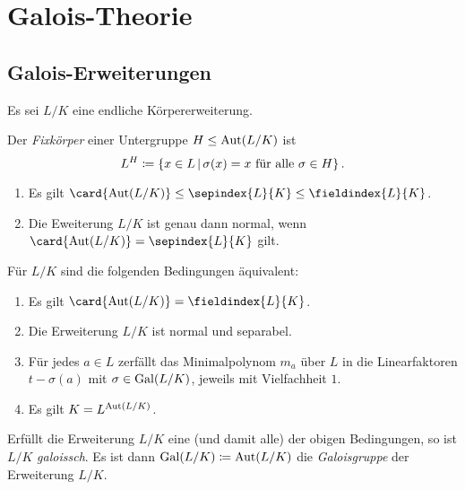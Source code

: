 \chapter{Galois-Theorie}





\section{Galois-Erweiterungen}

Es sei $L/K$ eine endliche Körpererweiterung.

\begin{definition}
  Der \emph{Fixkörper} einer Untergruppe $H \mathrel{\leq} \operatorname{Aut}(L/K)$ ist
  \[
              L^H
    \defined  \{
                x \in L
              \suchthat
                \text{$\sigma(x) = x$ für alle $\sigma \in H$}
              \} \,.
  \]

\end{definition}

\begin{lemma}
  \begin{enumerate}
    \item
      Es gilt $\card{\Aut{L/K}} \leq \sepindex{L}{K} \leq \fieldindex{L}{K}$.
    \item
      Die Eweiterung $L/K$ ist genau dann normal, wenn $\card{\Aut{L/K}} = \sepindex{L}{K}$ gilt.
  \end{enumerate}
\end{lemma}


\begin{proposition}
  Für $L/K$ sind die folgenden Bedingungen äquivalent:
  \begin{enumerate}
    \item
      Es gilt $\card{\Aut{L/K}} = \fieldindex{L}{K}$.
    \item
      Die Erweiterung $L/K$ ist normal und separabel.
    \item
      Für jedes $a \in L$ zerfällt das Minimalpolynom $m_a$ über $L$ in die Linearfaktoren $t - \sigma(a)$ mit $\sigma \in \operatorname{Gal}(L/K)$, jeweils mit Vielfachheit $1$.
    \item
      Es gilt $K = L^{\operatorname{Aut}(L/K)}$.
  \end{enumerate}
\end{proposition}

\begin{definition}
  Erfüllt die Erweiterung $L/K$ eine \textup(und damit alle\textup) der obigen Bedingungen, so ist $L/K$ \emph{galoissch}.
  Es ist dann $\operatorname{Gal}(L/K) \coloneqq \operatorname{Aut}(L/K)$ die \emph{Galoisgruppe} der Erweiterung $L/K$.
\end{definition}

